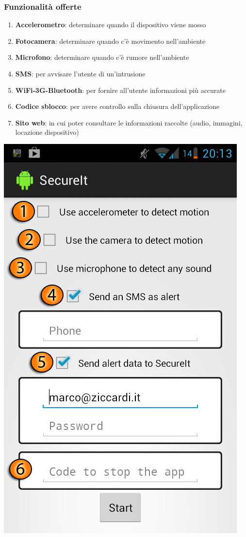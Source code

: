 \documentclass{beamer}
\begin{document}
\begin{frame}
\frametitle{Funzionalità offerte}
\noindent\begin{minipage}[c]{.7\textwidth}
\begin{enumerate}
  \item \textbf{Accelerometro}: determinare quando il dispositivo viene mosso
  \item \textbf{Fotocamera}: determinare quando c'è movimento nell'ambiente
  \item \textbf{Microfono}: determinare quando c'è rumore nell'ambiente
  \item \textbf{SMS}: per avvisare l'utente di un'intrusione
  \item \textbf{WiFi-3G-Bluetooth}: per fornire all'utente informazioni più accurate
  \item \textbf{Codice sblocco}: per avere controllo sulla chiusura dell'applicazione
  \item \textbf{Sito web}: in cui poter consultare le informazioni raccolte (audio, immagini, locazione dispositivo)
\end{enumerate}
\end{minipage}\begin{minipage}[c]{.25\textwidth}
\includegraphics[scale=.2]{./img/firstpage.png}
\end{minipage}
\end{frame}
\end{document}
